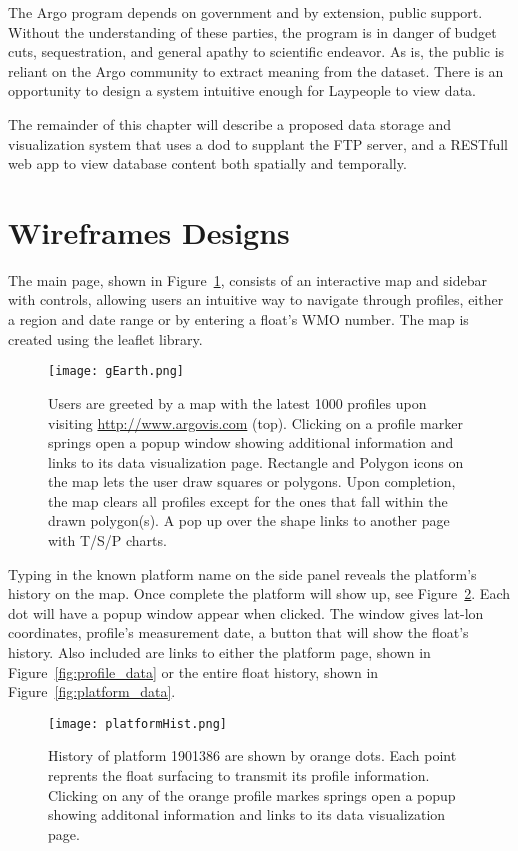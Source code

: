 The Argo program depends on government and by extension, public support. Without the understanding of these parties, the program is in danger of budget cuts, sequestration, and general apathy to scientific endeavor. As is, the public is reliant on the Argo community to extract meaning from the dataset. There is an opportunity to design a system intuitive enough for Laypeople to view data. 

The remainder of this chapter will describe a proposed data storage and visualization system that uses a \gls{dod} to supplant the FTP server, and a RESTfull web app to view database content both spatially and temporally.

\section{Wireframes Designs}
The main page, shown in Figure~\ref{fig:main_page}, consists of an interactive map and sidebar with controls, allowing users an intuitive way to navigate through profiles, either a region and date range or by entering a float's WMO number. The map is created using the \gls{leaflet} library.

\begin{figure}[ht]
\begin{minipage}{6in}
\centering
\texttt{[image: gEarth.png]}
\caption{\label{fig:main_page} Users are greeted by a map with the latest 1000 profiles upon visiting \url{http://www.argovis.com} (top). Clicking on a profile marker springs open a popup window showing additional information and links to its data visualization page. Rectangle and Polygon icons on the map lets the user draw squares or polygons. Upon completion, the map clears all profiles except for the ones that fall within the drawn polygon(s). A pop up over the shape links to another page with T/S/P charts.}
\end{minipage}
\end{figure}
Typing in the known platform name on the side panel reveals the platform's history on the map. Once complete the platform will show up, see Figure~\ref{fig:prof_hist}. Each dot will have a popup window appear when clicked. The window gives lat-lon coordinates, profile's measurement date, a button that will show the float's history. Also included are links to either the platform page, shown in Figure~\ref{fig:profile_data} or the entire float history, shown in Figure~\ref{fig:platform_data}.

\begin{figure}[ht]
\centering
\begin{minipage}{6in}
\texttt{[image: platformHist.png]}
\caption{\label{fig:prof_hist} History of platform 1901386 are shown by orange dots. Each point reprents the float surfacing to transmit its profile information. Clicking on any of the orange profile markes springs open a popup showing additonal information and links to its data visualization page.}
\end{minipage}
\end{figure}

